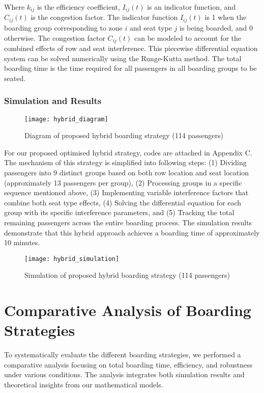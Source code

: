 \documentclass[12pt]{article}
\begin{document}
Where $k_{ij}$ is the efficiency coefficient, $I_{ij}(t)$ is an indicator function, and $C_{ij}(t)$ is the congestion factor. The indicator function $I_{ij}(t)$ is 1 when the boarding group corresponding to zone $i$ and seat type $j$ is being boarded, and 0 otherwise. The congestion factor $C_{ij}(t)$ can be modeled to account for the combined effects of row and seat interference. This piecewise differential equation system can be solved numerically using the Runge-Kutta method. The total boarding time is the time required for all passengers in all boarding groups to be seated.

\subsubsection{Simulation and Results}

\begin{figure}[h]
    \centering
    \texttt{[image: hybrid\_diagram]}
    \caption{Diagram of proposed hybrid boarding strategy (114 passengers)}
    \label{fig:hybrid_diagram}
\end{figure}

For our proposed optimised hybrid strategy, codes are attached in Appendix C. The mechanism of this strategy is simplified into following steps: (1) Dividing passengers into 9 distinct groups based on both row location and seat location (approximately 13 passengers per group), (2) Processing groups in a specific sequence mentioned above, (3) Implementing variable interference factors that combine both seat type effects, (4) Solving the differential equation for each group with its specific interference parameters, and (5) Tracking the total remaining passengers across the entire boarding process. The simulation results demonstrate that this hybrid approach achieves a boarding time of approximately 10 minutes.

\begin{figure}[h]
    \centering
    \texttt{[image: hybrid\_simulation]}
    \caption{Simulation of proposed hybrid boarding strategy (114 passengers)}
    \label{fig:hybrid_simulation}
\end{figure}

\section{Comparative Analysis of Boarding Strategies}

To systematically evaluate the different boarding strategies, we performed a comparative analysis focusing on total boarding time, efficiency, and robustness under various conditions. The analysis integrates both simulation results and theoretical insights from our mathematical models.
\end{document}
